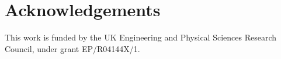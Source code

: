 \documentclass[10pt,sigconf]{acmart}
\begin{document}
\section*{Acknowledgements}
\footnotesize

This work is funded by the UK Engineering and Physical Sciences Research Council, under
grant EP/R04144X/1.

\balance


\end{document}
